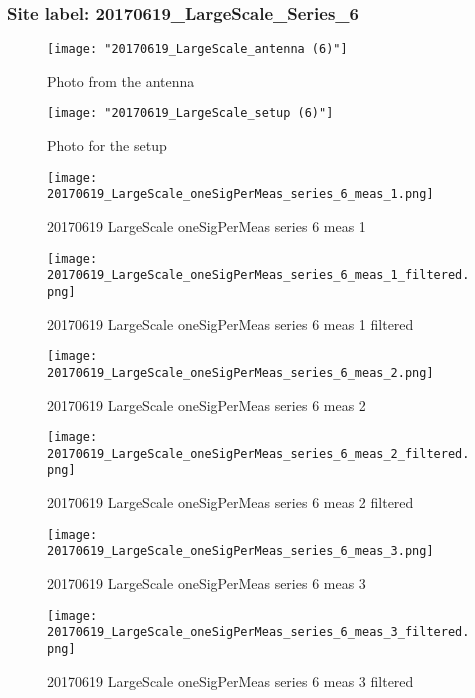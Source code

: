 \subsubsection{Site label: 20170619\_LargeScale\_Series\_6}
\begin{figure}[ht] \caption{Photo from the antenna}
\texttt{[image: "20170619\_LargeScale\_antenna (6)"]}\centering\end{figure}
\begin{figure}[ht] \caption{Photo for the setup}
\texttt{[image: "20170619\_LargeScale\_setup (6)"]}\centering\end{figure}
\begin{figure}[ht] \caption{20170619 LargeScale oneSigPerMeas series 6 meas 1}
\texttt{[image: 20170619\_LargeScale\_oneSigPerMeas\_series\_6\_meas\_1.png]}\centering\end{figure}
\begin{figure}[ht] \caption{20170619 LargeScale oneSigPerMeas series 6 meas 1 filtered}
\texttt{[image: 20170619\_LargeScale\_oneSigPerMeas\_series\_6\_meas\_1\_filtered.png]}\centering\end{figure}
\begin{figure}[ht] \caption{20170619 LargeScale oneSigPerMeas series 6 meas 2}
\texttt{[image: 20170619\_LargeScale\_oneSigPerMeas\_series\_6\_meas\_2.png]}\centering\end{figure}
\begin{figure}[ht] \caption{20170619 LargeScale oneSigPerMeas series 6 meas 2 filtered}
\texttt{[image: 20170619\_LargeScale\_oneSigPerMeas\_series\_6\_meas\_2\_filtered.png]}\centering\end{figure}
\begin{figure}[ht] \caption{20170619 LargeScale oneSigPerMeas series 6 meas 3}
\texttt{[image: 20170619\_LargeScale\_oneSigPerMeas\_series\_6\_meas\_3.png]}\centering\end{figure}
\begin{figure}[ht] \caption{20170619 LargeScale oneSigPerMeas series 6 meas 3 filtered}
\texttt{[image: 20170619\_LargeScale\_oneSigPerMeas\_series\_6\_meas\_3\_filtered.png]}\centering\end{figure}
\clearpage
